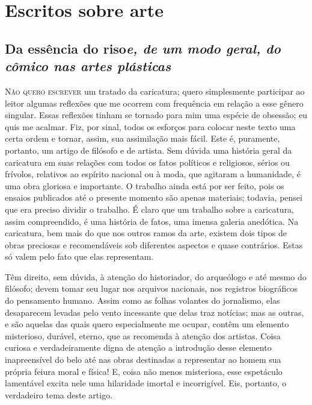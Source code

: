 \part{Escritos sobre arte}

\chapter*{Da essência do riso\break \emph{\large{e, de um modo geral, do cômico nas artes plásticas}}}



\setcounter{@sectionNumCenter}{0}

\sectionitem

\noindent\textsc{Não quero escrever} um tratado da caricatura; quero simplesmente
participar ao leitor algumas reflexões que me ocorrem com frequência em
relação a esse gênero singular. Essas reflexões tinham se tornado para
mim uma espécie de obsessão; eu quis me acalmar. Fiz, por sinal, todos
os esforços para colocar neste texto uma certa ordem e tornar, assim,
sua assimilação mais fácil. Este é, puramente, portanto, um artigo de
filósofo e de artista. Sem dúvida uma história geral da caricatura em
suas relações com todos os fatos políticos e religiosos, sérios ou
frívolos, relativos ao espírito nacional ou à moda, que agitaram a
humanidade, é uma obra gloriosa e importante. O trabalho ainda está por
ser feito, pois os ensaios publicados até o presente momento são apenas
materiais; todavia, pensei que era preciso dividir o trabalho. É claro
que um trabalho sobre a caricatura, assim compreendido, é uma história
de fatos, uma imensa galeria anedótica. Na caricatura, bem mais do que
nos outros ramos da arte, existem dois tipos de obras preciosas e
recomendáveis sob diferentes aspectos e quase contrários. Estas só
valem pelo fato que elas representam.

Têm direito, sem dúvida, à atenção do historiador, do arqueólogo e até
mesmo do filósofo; devem tomar seu lugar nos arquivos nacionais, nos
registros biográficos do pensamento humano. Assim como as folhas
volantes do jornalismo, elas desaparecem levadas pelo vento incessante
que delas traz notícias; mas as outras, e são aquelas das quais quero
especialmente me ocupar, contêm um elemento misterioso, durável,
eterno, que as recomenda à atenção dos artistas. Coisa curiosa e
verdadeiramente digna de atenção a introdução desse elemento
inapreensível do belo até nas obras destinadas a representar ao homem
sua própria feiura moral e física! E, coisa não menos misteriosa, esse
espetáculo lamentável excita nele uma hilaridade imortal e
incorrigível. Eis, portanto, o verdadeiro tema deste artigo.


